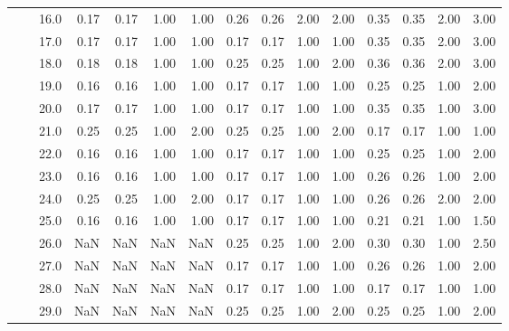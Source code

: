 \begin{tabular}{lllrrrrrrrrrrrr}
           &     & 16.0 &       0.17 &      0.17 & 1.00 &   1.00 &       0.26 &      0.26 & 2.00 &   2.00 &       0.35 &      0.35 & 2.00 &   3.00 \\
           &     & 17.0 &       0.17 &      0.17 & 1.00 &   1.00 &       0.17 &      0.17 & 1.00 &   1.00 &       0.35 &      0.35 & 2.00 &   3.00 \\
           &     & 18.0 &       0.18 &      0.18 & 1.00 &   1.00 &       0.25 &      0.25 & 1.00 &   2.00 &       0.36 &      0.36 & 2.00 &   3.00 \\
           &     & 19.0 &       0.16 &      0.16 & 1.00 &   1.00 &       0.17 &      0.17 & 1.00 &   1.00 &       0.25 &      0.25 & 1.00 &   2.00 \\
           &     & 20.0 &       0.17 &      0.17 & 1.00 &   1.00 &       0.17 &      0.17 & 1.00 &   1.00 &       0.35 &      0.35 & 1.00 &   3.00 \\
           &     & 21.0 &       0.25 &      0.25 & 1.00 &   2.00 &       0.25 &      0.25 & 1.00 &   2.00 &       0.17 &      0.17 & 1.00 &   1.00 \\
           &     & 22.0 &       0.16 &      0.16 & 1.00 &   1.00 &       0.17 &      0.17 & 1.00 &   1.00 &       0.25 &      0.25 & 1.00 &   2.00 \\
           &     & 23.0 &       0.16 &      0.16 & 1.00 &   1.00 &       0.17 &      0.17 & 1.00 &   1.00 &       0.26 &      0.26 & 1.00 &   2.00 \\
           &     & 24.0 &       0.25 &      0.25 & 1.00 &   2.00 &       0.17 &      0.17 & 1.00 &   1.00 &       0.26 &      0.26 & 2.00 &   2.00 \\
           &     & 25.0 &       0.16 &      0.16 & 1.00 &   1.00 &       0.17 &      0.17 & 1.00 &   1.00 &       0.21 &      0.21 & 1.00 &   1.50 \\
           &     & 26.0 &        NaN &       NaN &  NaN &    NaN &       0.25 &      0.25 & 1.00 &   2.00 &       0.30 &      0.30 & 1.00 &   2.50 \\
           &     & 27.0 &        NaN &       NaN &  NaN &    NaN &       0.17 &      0.17 & 1.00 &   1.00 &       0.26 &      0.26 & 1.00 &   2.00 \\
           &     & 28.0 &        NaN &       NaN &  NaN &    NaN &       0.17 &      0.17 & 1.00 &   1.00 &       0.17 &      0.17 & 1.00 &   1.00 \\
           &     & 29.0 &        NaN &       NaN &  NaN &    NaN &       0.25 &      0.25 & 1.00 &   2.00 &       0.25 &      0.25 & 1.00 &   2.00 \\

\end{tabular}
